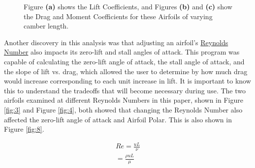\documentclass{article}
\begin{document}
\begin{figure}[!htb]
  \centering
   \label{fig:2}
   \label{fig:2}
   \label{fig:2}
  \caption{Figure \textbf{(a)} shows the Lift Coefficients, and Figures \textbf{(b)} and \textbf{(c)} show the Drag and Moment Coefficients for these Airfoils of varying camber length.}
  \label{fig:2}
\end{figure}

Another discovery in this analysis was that adjusting an airfoil's \hyperlink{Re}{Reynolds Number} also impacts its zero-lift and stall angles of attack. This program was capable of calculating the zero-lift angle of attack, the stall angle of attack, and the slope of lift vs. drag, which allowed the user to determine by how much drag would increase corresponding to each unit increase in lift. It is important to know this to understand the tradeoffs that will become necessary during use. The two airfoils examined at different Reynolds Numbers in this paper, shown in Figure \ref{fig:3} and Figure \ref{fig:4}, both showed that changing the Reynolds Number also affected the zero-lift angle of attack and Airfoil Polar. This is also shown in Figure \ref{fig:8}. \newline

\begin{equation} \label{eq:4}
\begin{aligned}
        	Re = \frac{uL}{\nu} \\
	= \frac{\rho uL}{\mu} 
\end{aligned}
\end{equation}
\newline
\end{document}
